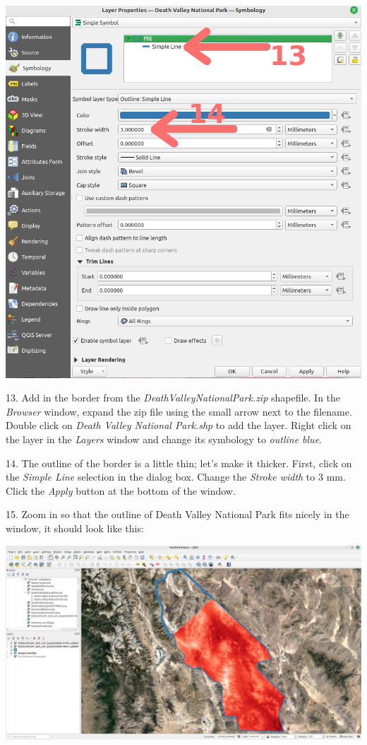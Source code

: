 \documentclass[oneside,a4paper,11pt,explicit]{book}
\begin{document}
\centerline{\includegraphics[width=.625\textwidth]{DVlines.png}}

13. Add in the border from the \textit{DeathValleyNationalPark.zip} shapefile. In the \textit{Browser} window, expand the zip file using the small arrow next to the filename. Double click on \textit{Death Valley National Park.shp} to add the layer. Right click on the layer in the \textit{Layers} window and change its symbology to \textit{outline blue}. 

14. The outline of the border is a little thin; let's make it thicker. First, click on the \textit{Simple Line} selection in the dialog box. Change the \textit{Stroke width} to 3 mm. Click the \textit{Apply} button at the bottom of the window.

15. Zoom in so that the outline of Death Valley National Park fits nicely in the window, it should look like this:

\vspace{.25em}

\centerline{\includegraphics[width=\textwidth]{DV_LST.png}}
\end{document}
